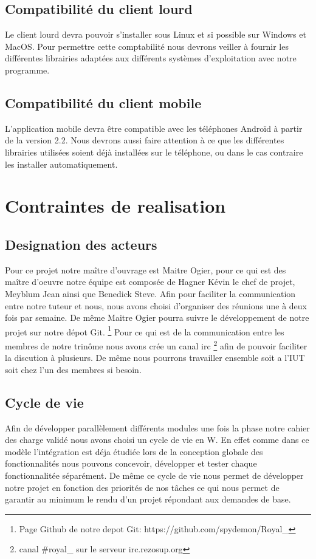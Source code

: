 \subsection{Compatibilité du client lourd}
Le client lourd devra pouvoir s'installer sous Linux et si possible sur Windows et MacOS. 
Pour permettre cette comptabilité nous devrons veiller à fournir les différentes librairies adaptées aux différents systèmes d'exploitation avec notre programme. 

\subsection{Compatibilité du client mobile}
L'application mobile devra être compatible avec les téléphones Androïd à partir de la version 2.2. 
Nous devrons aussi faire attention à ce que les différentes librairies utilisées soient déjà installées sur le téléphone, ou dans le cas contraire les installer automatiquement.

\section{Contraintes de realisation}

\subsection{Designation des acteurs}
Pour ce projet notre maître d'ouvrage est Maitre Ogier, pour ce qui est des maître d'oeuvre notre équipe est composée de Hagner Kévin le chef de projet, Meyblum Jean ainsi que Benedick Steve.
Afin pour faciliter la communication entre notre tuteur et nous, nous avons choisi d'organiser des réunions une à deux fois par semaine. De même Maitre Ogier pourra suivre le développement de notre projet sur notre dépot Git.
\footnote{Page Github de notre depot Git: https://github.com/spydemon/Royal\_} 
Pour ce qui est de la communication entre les membres de notre trinôme nous avons crée un canal irc \footnote{ canal \#royal\_ sur le serveur irc.rezosup.org} afin de pouvoir faciliter la discution à plusieurs. 
De même nous pourrons travailler ensemble soit a l'IUT soit chez l'un des membres si besoin.

\subsection{Cycle de vie}
Afin de développer parallèlement différents modules une fois la phase notre cahier des charge validé nous avons choisi un cycle de vie en W. 
En effet comme dans ce modèle l'intégration est déja étudiée lors de la conception globale des fonctionnalités nous pouvons concevoir, développer et tester chaque fonctionnalitée séparément. 
De même ce cycle de vie nous permet de développer notre projet en fonction des priorités de nos tâches ce qui nous permet de garantir au minimum le rendu d'un projet répondant aux demandes de base.
